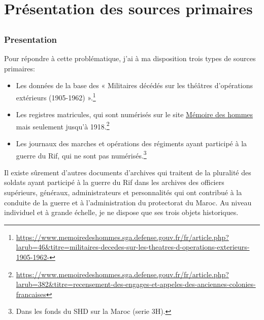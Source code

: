 \part{Présentation des sources primaires}
\chapter{}
\section{Presentation}
Pour répondre à cette problématique, j’ai à ma disposition trois types de sources primaires:
\begin{itemize}
 \item{Les données de la base des « Militaires décédés sur les théâtres d'opérations extérieurs (1905-1962) ».\footnote{\url{https://www.memoiredeshommes.sga.defense.gouv.fr/fr/article.php?larub=46&titre=militaires-decedes-sur-les-theatres-d-operations-exterieurs-1905-1962-}}}
\item{Les registres matricules, qui sont numérisés sur le site \underline{Mémoire des hommes} mais seulement jusqu'à 1918.\footnote{\url{https://www.memoiredeshommes.sga.defense.gouv.fr/fr/article.php?larub=382&titre=recensement-des-engages-et-appeles-des-anciennes-colonies-francaises}}}
\item{Les journaux des marches et opérations des régiments ayant participé à la guerre du Rif, qui ne sont pas numérisés.\footnote{Dans les fonds du SHD sur la Maroc (serie 3H).}}
\end{itemize}
Il existe sûrement d’autres documents d’archives qui traitent de la pluralité des soldats ayant participé à la guerre du Rif dans les archives des officiers supérieurs, généraux, administrateurs et personnalités qui ont contribué à la conduite de la guerre et à l’administration du protectorat du Maroc. Au niveau individuel et à grande échelle, je ne dispose que ses trois objets historiques.\\ 
